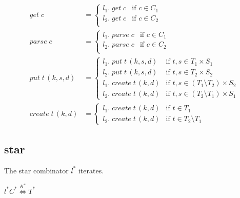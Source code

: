 \documentclass[12pt,fleqn]{amsart}
\newcommand{\ensmath}[1]{\ensuremath{#1}\xspace}
\newcommand{\opnam}[1]{\ensmath{\operatorname{\mathit{#1}}}}
\newcommand{\nparse}{\opnam{parse}}
\newcommand{\lget}[1]{\opnam{get}{#1}}
\newcommand{\lparse}[1]{\nparse{#1}}
\newcommand{\lput}[2]{\opnam{put}{#1}\,{(#2)}}
\newcommand{\lcreate}[2]{\opnam{create}{#1}\,{(#2)}}
\newcommand{\lenstype}[3][K]{\ensmath{{#2}\stackrel{#1}{\Longleftrightarrow}{#3}}}
\newcommand{\cstar}[1]{\ensmath{#1^*}}
\newcommand{\uastar}[1]{\ensmath{#1^{!*}}}
\newcommand{\key}[1]{\ensmath{\kappa(#1)}}
\begin{document}
\begin{align*}
  \lget{c} &=
     \begin{cases}
       l_1.\lget{c} & \text{if } c \in C_1\\
       l_2.\lget{c} & \text{if } c \in C_2\\
     \end{cases}
  \\
  \lparse{c} &=
     \begin{cases}
       l_1.\lparse{c} & \text{if } c \in C_1\\
       l_2.\lparse{c} & \text{if } c \in C_2\\
     \end{cases}
  \\
  \lput{t}{k, s, d} &=
     \begin{cases}
       l_1.\lput{t}{k, s, d} & \text{if } t, s \in T_1 \times S_1 \\
       l_2.\lput{t}{k, s, d} & \text{if } t, s \in T_2 \times S_2 \\
       l_1.\lcreate{t}{k, d} & \text{if } t, s \in (T_1\setminus T_2)
       \times S_2\\
       l_2.\lcreate{t}{k, d} & \text{if } t, s \in (T_2\setminus T_1)
       \times S_1
     \end{cases}\\
  \lcreate{t}{k, d} &=
     \begin{cases}
       l_1.\lcreate{t}{k, d} & \text{if } t\in T_1\\
       l_2.\lcreate{t}{k, d} & \text{if } t\in T_2\setminus T_1
     \end{cases}
\end{align*}

\subsection{star}

The star combinator $\cstar{l}$ iterates.

\infrule{l\in\lenstype{C}{T} \andalso \uastar{C} \andalso \uastar{\key{T}}}
        {\cstar{l}\in\lenstype[\cstar{K}]{\cstar{C}}{\cstar{T}}}
\end{document}
